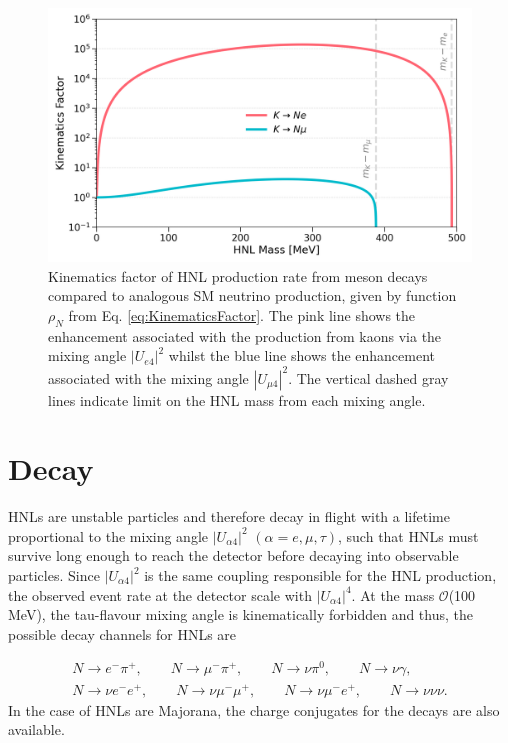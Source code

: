 \begin{figure}[htbp!] 
\centering    
\includegraphics[width=1.0\textwidth]{kinematics_factor}
\caption[KinematicsFactor]{
Kinematics factor of HNL production rate from meson decays compared to analogous SM neutrino production, given by function $\rho_{N}$ from Eq. \ref{eq:KinematicsFactor}.
The pink line shows the enhancement associated with the production from kaons via the mixing angle $|U_{e4}|^{2}$ whilst the blue line shows the enhancement associated with the mixing angle $|U_{\mu4}|^{2}$.
The vertical dashed gray lines indicate limit on the HNL mass from each mixing angle. 
}
\label{fig:KinematicsFactor}
\end{figure}

\section{Decay}

HNLs are unstable particles and therefore decay in flight with a lifetime proportional to the mixing angle $|U_{\alpha4}|^{2}$ $(\alpha=e,\mu,\tau)$, such that HNLs must survive long enough to reach the detector before decaying into observable particles.
Since $|U_{\alpha4}|^{2}$ is the same coupling responsible for the HNL production, the observed event rate at the detector scale with $|U_{\alpha4}|^{4}$.
At the mass $\mathcal{O}$(100 MeV), the tau-flavour mixing angle is kinematically forbidden and thus, the possible decay channels for HNLs are \cite{}

\begin{equation}
\begin{split}
	N\rightarrow e^{-}\pi^{+},\qquad 
	N\rightarrow \mu^{-}\pi^{+},\qquad
	N\rightarrow \nu \pi^{0},\qquad 
	N\rightarrow \nu \gamma,\qquad \\ 
	N\rightarrow \nu e^{-} e^{+},\qquad 
	N\rightarrow \nu \mu^{-} \mu^{+},\qquad 
	N\rightarrow \nu \mu^{-}e^{+},\qquad
	N\rightarrow \nu \nu \nu. 
\end{split}
\end{equation}
In the case of HNLs are Majorana, the charge conjugates for the decays are also available.

